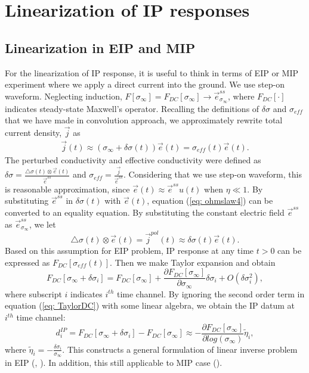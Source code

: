 \documentclass[a4paper, 11pt]{article}
\newcommand{\siginf}{\sigma_\infty}
\newcommand{\dsig}{\triangle\sigma}
\renewcommand {\j}  { {\vec j} }
\newcommand {\e}  { {\vec e} }
\newcommand{\peta}{\tilde{\eta}}
\newcommand{\dip}{d^{IP}}
\newcommand{\sigpert}{\delta\sigma}
\begin{document}

\section{Linearization of IP responses}


\subsection{Linearization in EIP and MIP}
For the linearization of IP response, it is useful to think in terms of EIP or MIP experiment where we apply a direct current into the ground. We use step-on waveform. Neglecting induction, $F[\siginf]=F_{DC}[\siginf] \rightarrow \e^{ss}_{\siginf}$, where $F_{DC}[\cdot]$ indicates steady-state Maxwell's operator. Recalling the definitions of $\delta\sigma$ and $\sigma_{eff}$ that we have made in convolution approach, we approximately rewrite total current density, $\j$ as
\begin{eqnarray}
	\j(t) \approx (\siginf + \delta\sigma(t))\e(t) = \sigma_{eff}(t)\e(t).
  	\label{eq: ohmslaw4}
\end{eqnarray}
The perturbed conductivity and effective conductivity were defined as $\delta\sigma = \frac{\dsig(t)\otimes\e(t)}{\e^{ss}}$ and $\sigma_{eff} = \frac{\j}{\e^{ss}}$. Considering that we use step-on waveform, this is reasonable approximation, since $\e(t)\approx \e^{ss}u(t)$ when $\eta \ll 1$. By substituting $\vec{e}^{ss}$ in $\delta\sigma(t)$ with $\vec{e}(t)$, equation (\ref{eq: ohmslaw4}) can be converted to an equality equation. By substituting the constant electric field $\e^{ss}$ as $\e_{\siginf}^{ss}$, we let
\begin{equation}
  \dsig(t)\otimes\e(t) = \j^{pol}(t) \approx \delta\sigma(t)\e(t).
  \label{eq: jpol_approx}
\end{equation}
Based on this assumption for EIP problem, IP response at any time $t>0$ can be expressed as $F_{DC}[\sigma_{eff}(t)]$. Then we make Taylor expansion and obtain
\begin{equation}
  F_{DC}[\siginf + \delta\sigma_i] = F_{DC}[\siginf] + \frac{\partial F_{DC}[\siginf]}{\partial\siginf}\delta\sigma_i + O(\delta\sigma_i^2),
  \label{eq: TaylorDC}
\end{equation}
where subscript $i$ indicates $i^{th}$ time channel. By ignoring the second order term in equation (\ref{eq: TaylorDC}) with some linear algebra, we obtain the IP datum at $i^{th}$ time channel:
\begin{equation}
  \dip_i = F_{DC}[\siginf + \delta\sigma_i] - F_{DC}[\siginf] \approx -\frac{\partial F_{DC}[\siginf]}{\partial log(\siginf)}\peta_i,
  \label{eq: EIPlinear1}
\end{equation}
where $\peta_i = -\frac{\sigpert_i}{\siginf}$. This constructs a general formulation of linear inverse problem in EIP (\cite{Yuval1997}, \cite{Hordt2006}). In addition, this still applicable to MIP case (\cite{seigel1974,Chen2003}).
\end{document}
